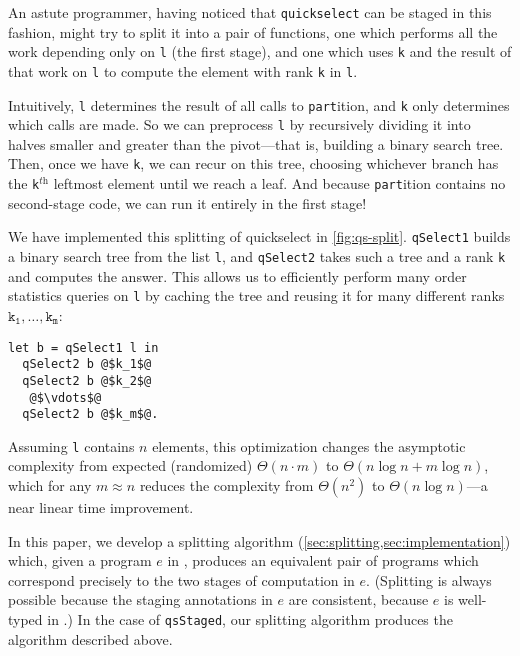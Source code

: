 \begin{abstrsyn}


An astute programmer, having noticed that \texttt{quickselect} can be staged in
this fashion, might try to split it into a pair of functions, one which performs
all the work depending only on \texttt{l} (the first stage), and one which uses
\texttt{k} and the result of that work on \texttt{l} to compute the element with
rank \texttt{k} in \texttt{l}. 

Intuitively, \texttt{l} determines the result of all calls to
\texttt{part}ition, and \texttt{k} only determines which calls are made. So we
can preprocess \texttt{l} by recursively dividing it into halves smaller and
greater than the pivot---that is, building a binary search tree. Then, once we
have \texttt{k}, we can recur on this tree, choosing whichever branch has the
\texttt{k}${}^\textit{th}$ leftmost element until we reach a leaf. And because
\texttt{part}ition contains no second-stage code, we can run it entirely in the
first stage!

We have implemented this splitting of quickselect in \ref{fig:qs-split}.
\texttt{qSelect1} builds a binary search tree from the list \texttt{l}, and
\texttt{qSelect2} takes such a tree and a rank \texttt{k} and computes the
answer. This allows us to efficiently perform many order statistics queries on
\texttt{l} by caching the tree and reusing it for many different ranks
$\mathtt{k_1},\dots,\mathtt{k_m}$:
%
\begin{lstlisting}
let b = qSelect1 l in
  qSelect2 b @$k_1$@
  qSelect2 b @$k_2$@
   @$\vdots$@ 
  qSelect2 b @$k_m$@.
\end{lstlisting}

Assuming \texttt{l} contains $n$ elements, this optimization changes the
asymptotic complexity from expected (randomized) $\Theta(n \cdot m)$ to
$\Theta(n\log{n} + m\log{n})$, which for any $m \approx n$ reduces the
complexity from $\Theta (n^2)$ to $\Theta(n\log{n})$---a near linear time
improvement. 

In this paper, we develop a splitting algorithm
(\ref{sec:splitting,sec:implementation}) which, given a program $e$ in \lang,
produces an equivalent pair of programs which correspond precisely to the two
stages of computation in $e$.
(Splitting is always possible because the staging annotations in $e$ are
consistent, because $e$ is well-typed in \lang.) In the case of
\texttt{qsStaged}, our splitting algorithm produces the algorithm described
above.



\end{abstrsyn}

